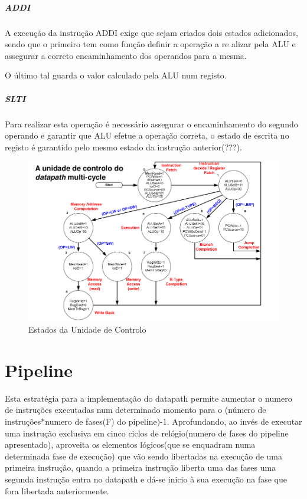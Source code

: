 \documentclass[10pt,a4paper]{book}
\begin{document}
			\subparagraph{ADDI}
				A execução da instrução ADDI exige que sejam criados dois estados adicionados, sendo que o primeiro tem como função definir a operação a re alizar pela ALU e assegurar a correto encaminhamento dos operandos para a mesma.

				O último tal guarda o valor calculado pela ALU num registo.

			\subparagraph{SLTI}

				Para realizar esta operação é necessário assegurar o encaminhamento do segundo operando e garantir que ALU efetue a operação correta, o estado de escrita no registo é garantido pelo mesmo estado da instrução anterior(???).



				\begin{figure}[htp]
			    	\centering
			    	\includegraphics[scale=0.4]{FSm.png}
			    	\caption{Estados da Unidade de Controlo }
			    	\label{multy-cycle FSM}
				\end{figure}


  \section{Pipeline}

    Esta estratégia para a implementação do datapath permite aumentar o numero de instruções executadas num determinado momento para o (número de instruções*numero de fases(F) do pipeline)-1. Aprofundando, ao invés de executar uma instrução exclusiva em cinco ciclos de relógio(numero de fases do pipeline apresentado), aproveita os elementos lógicos(que se enquadram numa determinada fase de execução) que vão sendo libertadas na execução de uma primeira instrução, quando a primeira instrução liberta uma das fases uma segunda instrução entra no datapath e dá-se inicio à sua execução na fase que fora libertada anteriormente.
\end{document}
